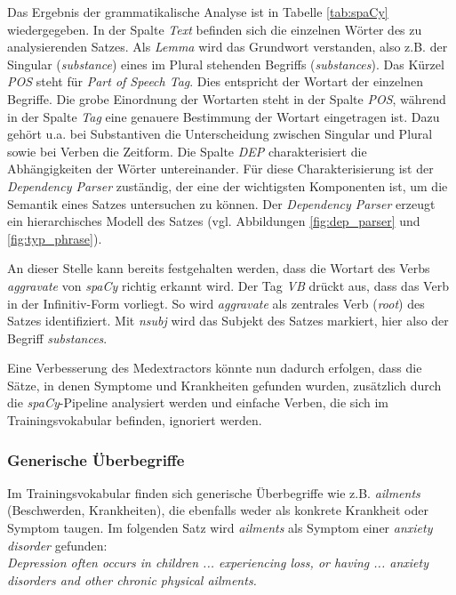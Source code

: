 Das Ergebnis der grammatikalische Analyse ist in Tabelle \ref{tab:spaCy} wiedergegeben. In der Spalte \emph{Text} befinden sich die einzelnen Wörter des zu analysierenden Satzes. Als \emph{Lemma} wird das Grundwort verstanden, also z.B. der Singular (\emph{substance}) eines im Plural stehenden Begriffs (\emph{substances}). 
Das Kürzel \emph{POS} steht für \emph{Part of Speech Tag}. Dies entspricht der Wortart der einzelnen Begriffe. Die grobe Einordnung der Wortarten steht in der Spalte \emph{POS}, während in der Spalte \emph{Tag} eine genauere Bestimmung der Wortart eingetragen ist. Dazu gehört u.a. bei Substantiven die Unterscheidung zwischen Singular und Plural sowie bei Verben die Zeitform. Die Spalte \emph{DEP} charakterisiert die Abhängigkeiten der Wörter untereinander. Für diese Charakterisierung ist der \emph{Dependency Parser} zuständig, der eine der wichtigsten Komponenten ist, um die Semantik eines Satzes untersuchen zu können. Der \emph{Dependency Parser} erzeugt ein hierarchisches Modell des Satzes (vgl. Abbildungen \ref{fig:dep_parser} und \ref{fig:typ_phrase}).

An dieser Stelle kann bereits festgehalten werden, dass die Wortart des Verbs \emph{aggravate} von \emph{spaCy} richtig erkannt wird. Der Tag \emph{VB} drückt aus, dass das Verb in der Infinitiv-Form vorliegt.  So wird \emph{aggravate} als zentrales Verb (\emph{root}) des Satzes identifiziert. Mit \emph{nsubj} wird das Subjekt des Satzes markiert, hier also der Begriff \emph{substances}.

Eine Verbesserung des Medextractors könnte nun dadurch erfolgen, dass die Sätze, in denen Symptome und Krankheiten gefunden wurden, zusätzlich durch die \emph{spaCy}-Pipeline analysiert werden und einfache Verben, die sich im Trainingsvokabular befinden, ignoriert werden.

\subsubsection{Generische Überbegriffe}
\label{subsec: generisch} 

Im Trainingsvokabular finden sich generische Überbegriffe wie z.B. \emph{ailments} (Beschwerden, Krankheiten), die ebenfalls weder als konkrete Krankheit oder Symptom taugen. Im folgenden Satz wird \emph{ailments} als Symptom einer \emph{anxiety disorder} gefunden:\\

\emph{\glqq Depression often occurs in children ... experiencing loss, or having ... anxiety disorders and other chronic physical ailments.\grqq}\\


